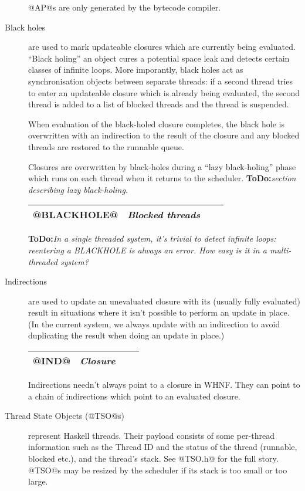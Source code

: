 \documentclass[11pt]{article}
\newcommand{\ToDo}[1]{{{\bf ToDo:}\sl #1}}
\begin{document}
\begin{description}
@AP@s are only generated by the bytecode compiler.

\item[Black holes] are used to mark updateable closures which are
currently being evaluated.  ``Black holing'' an object cures a
potential space leak and detects certain classes of infinite loops.
More imporantly, black holes act as synchronisation objects between
separate threads: if a second thread tries to enter an updateable
closure which is already being evaluated, the second thread is added
to a list of blocked threads and the thread is suspended.

When evaluation of the black-holed closure completes, the black hole
is overwritten with an indirection to the result of the closure and
any blocked threads are restored to the runnable queue.

Closures are overwritten by black-holes during a ``lazy black-holing''
phase which runs on each thread when it returns to the scheduler.
\ToDo{section describing lazy black-holing}.

\begin{center}
\begin{tabular}{|l|l|l|l|}\hline
@BLACKHOLE@ & \emph{Blocked threads} \\ \hline
\end{tabular}
\end{center}

\ToDo{In a single threaded system, it's trivial to detect infinite
loops: reentering a BLACKHOLE is always an error.  How easy is it in a
multi-threaded system?}

\item[Indirections] are used to update an unevaluated closure with its
(usually fully evaluated) result in situations where it isn't possible
to perform an update in place.  (In the current system, we always
update with an indirection to avoid duplicating the result when doing
an update in place.)

\begin{center}
\begin{tabular}{|l|l|l|l|}\hline
@IND@ & \emph{Closure} \\ \hline
\end{tabular}
\end{center}

Indirections needn't always point to a closure in WHNF.  They can
point to a chain of indirections which point to an evaluated closure.

\item[Thread State Objects (@TSO@s)] represent Haskell threads.  Their
payload consists of some per-thread information such as the Thread ID
and the status of the thread (runnable, blocked etc.), and the
thread's stack.  See @TSO.h@ for the full story.  @TSO@s may be
resized by the scheduler if its stack is too small or too large.


\end{description}
\end{document}
